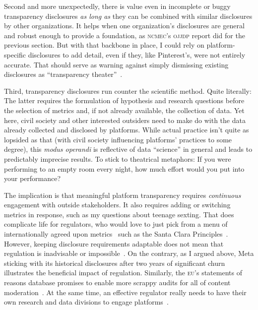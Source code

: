 \documentclass[nonacm,screen]{acmart}
\newcommand\V[1]{\textsc{\MakeLowercase{#1}}}
\newcommand\hidden[1]{}
\begin{document}
Second and more unexpectedly, there is value even in incomplete or buggy
transparency disclosures \emph{as long as} they can be combined with similar
disclosures by other organizations. It helps when one organization's disclosures
are general and robust enough to provide a foundation, as \V{NCMEC}'s \V{OJJDP}
report did for the previous section. But with that backbone in place, I could
rely on platform-specific disclosures to add detail, even if they, like
Pinterest's, were not entirely accurate. That should serve as warning against
simply dismissing existing disclosures as ``transparency
theater''~\cite{Douek2022}.

Third, transparency disclosures run counter the scientific method. Quite
literally: The latter requires the formulation of hypothesis and research
questions before the selection of metrics and, if not already available, the
collection of data. Yet here, civil society and other interested outsiders need
to make do with the data already collected and disclosed by platforms. While
actual practice isn't quite as lopsided as that (with civil society influencing
platforms' practices to some degree), this \emph{modus operandi} is reflective
of data ``science'' in general and leads to predictably imprecise results. To
stick to theatrical metaphors: If you were performing to an empty room every
night, how much effort would you put into your performance?

The implication is that meaningful platform transparency requires
\emph{continuous} engagement with outside stakeholders. It also requires adding
or switching metrics in response, such as my questions about teenage sexting.
That does complicate life for regulators, who would love to just pick from a
menu of internationally agreed upon metrics~\cite{HarlingHenesyea2023} such as
the Santa Clara
Principles~\cite{AccessNowACLUFoundationOfNorthernCaliforniaea2021}. However,
keeping disclosure requirements adaptable does not mean that regulation is
inadvisable or impossible~\cite{Douek2022,Klonick2023}. On the contrary, as I
argued above, Meta sticking with its historical disclosures after two years of
significant churn illustrates the beneficial impact of regulation. Similarly,
the \V{EU}'s statements of reasons database promises to enable more scrappy
audits for all of content moderation~\cite{TrujilloFagniea2024}. At the same
time, an effective regulator really needs to have their own research and data
divisions to engage platforms~\cite{Jaursch2022a,Jaursch2023}.

\hidden{
This need for continuous engagement should be taken into account when
considering the value and impact of transparency reporting.
}
\end{document}

